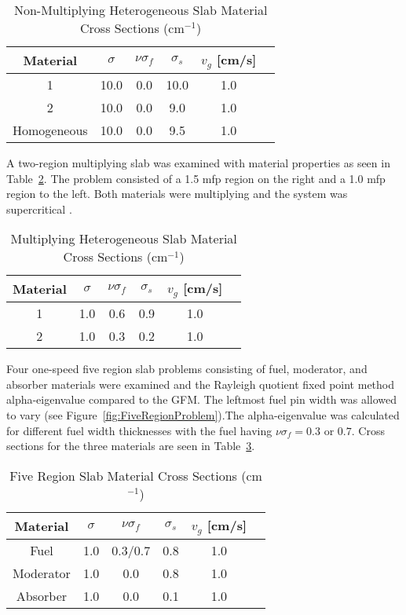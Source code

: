 \begin{table}[H]
    \centering
    \caption{Non-Multiplying Heterogeneous Slab Material Cross Sections (cm$^{-1}$)}
\label{table:BetzlerHetero}
    \begin{tabular}{*6c}
        \toprule
	Material & $\sigma$ & $\nu \sigma_{f}$ & $\sigma_{s}$ & $v_{g}$ [cm/s] \\ 
        \midrule
	1 & 10.0 & 0.0 & 10.0 & 1.0 \\
	2 & 10.0 & 0.0 & 9.0 & 1.0 \\
	Homogeneous & 10.0 & 0.0 & 9.5 & 1.0 \\
        \bottomrule
    \end{tabular}
\end{table}

A two-region multiplying slab was examined with material properties as seen in Table~\ref{table:BetzlerHeteroMult}. The problem consisted of a 1.5 mfp region on the right and a 1.0 mfp region to the left. Both materials were multiplying and the system was supercritical \cite{kornreich_greens_1997}.

\begin{table}[H]
    \centering
    \caption{Multiplying Heterogeneous Slab Material Cross Sections (cm$^{-1}$)}
\label{table:BetzlerHeteroMult}
    \begin{tabular}{*6c}
        \toprule
	Material & $\sigma$ & $\nu \sigma_{f}$ & $\sigma_{s}$ & $v_{g}$ [cm/s] \\ 
        \midrule
	1 & 1.0 & 0.6 & 0.9 & 1.0 \\
	2 & 1.0 & 0.3 & 0.2 & 1.0 \\ 
        \bottomrule
    \end{tabular}
\end{table}

Four one-speed five region slab problems consisting of fuel, moderator, and absorber materials were examined and the Rayleigh quotient fixed point method alpha-eigenvalue compared to the GFM. The leftmost fuel pin width was allowed to vary (see Figure~\ref{fig:FiveRegionProblem}).The alpha-eigenvalue was calculated for different fuel width thicknesses with the fuel having $\nu \sigma_{f} = 0.3$ or $0.7$. Cross sections for the three materials are seen in Table~\ref{table:BetzlerFive}.

\begin{table}[H]
    \centering
    \caption{Five Region Slab Material Cross Sections (cm$^{-1}$)}
\label{table:BetzlerFive}
    \begin{tabular}{*6c}
        \toprule
	Material & $\sigma$ & $\nu \sigma_{f}$ & $\sigma_{s}$ & $v_{g}$ [cm/s] \\ 
        \midrule
	Fuel & 1.0 & 0.3/0.7 & 0.8 & 1.0 \\
	Moderator & 1.0 & 0.0 & 0.8 & 1.0 \\ 
	Absorber & 1.0 & 0.0 & 0.1 & 1.0 \\ 
        \bottomrule
    \end{tabular}
\end{table}

